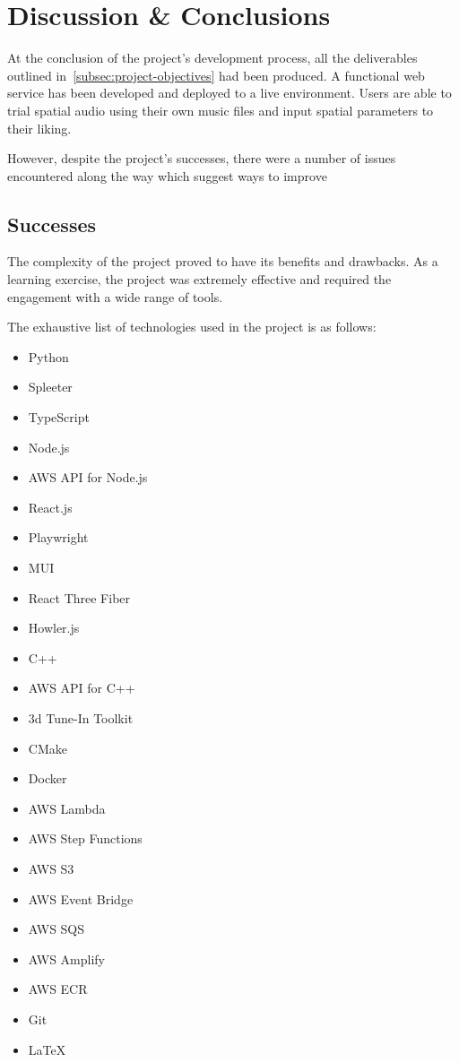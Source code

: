 \thispagestyle{plain}
\newpage
\section{Discussion \& Conclusions}\label{sec:discussion-conclusions}

\normalsize

At the conclusion of the project's development process,
all the deliverables outlined in~\ref{subsec:project-objectives} had been produced.
A functional web service has been developed
and deployed to a live environment.
Users are able to trial spatial audio using their own music files and input spatial parameters to their liking.

However, despite the project's successes,
there were a number of issues encountered along the way which suggest ways to improve

\subsection{Successes}\label{subsec:successes}

The complexity of the project proved to have its benefits and drawbacks.
As a learning exercise, the project was extremely effective and required the engagement with a wide range of tools.

The exhaustive list of technologies used in the project is as follows:

\begin{itemize}
    \item Python
    \item Spleeter
    \item TypeScript
    \item Node.js
    \item AWS API for Node.js
    \item React.js
    \item Playwright
    \item MUI
    \item React Three Fiber
    \item Howler.js
    \item C++
    \item AWS API for C++
    \item 3d Tune-In Toolkit
    \item CMake
    \item Docker
    \item AWS Lambda
    \item AWS Step Functions
    \item AWS S3
    \item AWS Event Bridge
    \item AWS SQS
    \item AWS Amplify
    \item AWS ECR
    \item Git
    \item LaTeX
\end{itemize}

